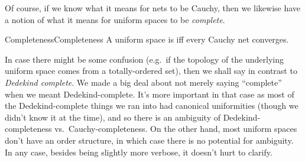 Of course, if we know what it means for nets to be Cauchy, then we likewise have a notion of what it means for uniform spaces to be \emph{complete}.
\begin{dfn}{Completeness}{Completeness}
A uniform space is  iff every Cauchy net converges.
\begin{rmk}
In case there might be some confusion (e.g.~if the topology of the underlying uniform space comes from a totally-ordered set), then we shall say  in contrast to \emph{Dedekind complete}.  We made a big deal about not merely saying ``complete'' when we meant Dedekind-complete.  It's more important in that case as most of the Dedekind-complete things we ran into had canonical uniformities (though we didn't know it at the time), and so there is an ambiguity of Dedekind-completeness vs.~Cauchy-completeness.  On the other hand, most uniform spaces don't have an order structure, in which case there is no potential for ambiguity.  In any case, besides being slightly more verbose, it doesn't hurt to clarify.
\end{rmk}
\end{dfn}

